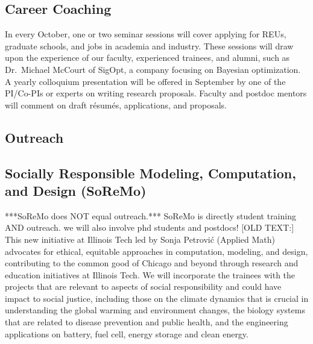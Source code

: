 \documentclass[11pt]{NSFamsart}
\newcommand{\FredNote}[1]{{\color{blue} Fred: #1}}
\begin{document}
\subsection*{Career Coaching}
In every October, one or two seminar sessions will cover applying for REUs, graduate schools, and jobs in academia and industry. These sessions will draw upon the experience of our faculty, experienced trainees, and alumni, such as Dr.\ Michael McCourt of SigOpt, a company focusing on Bayesian optimization.  A yearly colloquium presentation  will be offered in September by one of the PI/Co-PIs or experts on writing research proposals. Faculty and postdoc mentors will comment on draft r\'esum\'es,  applications, and proposals.  





 
\subsection{Outreach}
\subsection*{Socially Responsible Modeling, Computation, and Design
(SoReMo)}
{\color{magenta} ***SoReMo does NOT equal outreach.***  SoReMo is directly student training AND outreach. we will also involve phd students and postdocs!} 
[OLD TEXT:] This new initiative at Illinois Tech led by Sonja Petrovi\'c (Applied Math) advocates for ethical, equitable approaches in computation,
modeling, and design, contributing to the common good of Chicago and
beyond through research and education initiatives at Illinois Tech.
 We will incorporate the trainees with the projects that are relevant to aspects of social responsibility and could have impact to social justice, including those on the climate dynamics that is crucial in understanding the global warming and environment changes, the biology systems that are related to disease prevention and public health,  and the engineering applications on battery, fuel cell, energy storage and clean energy.
\end{document}
